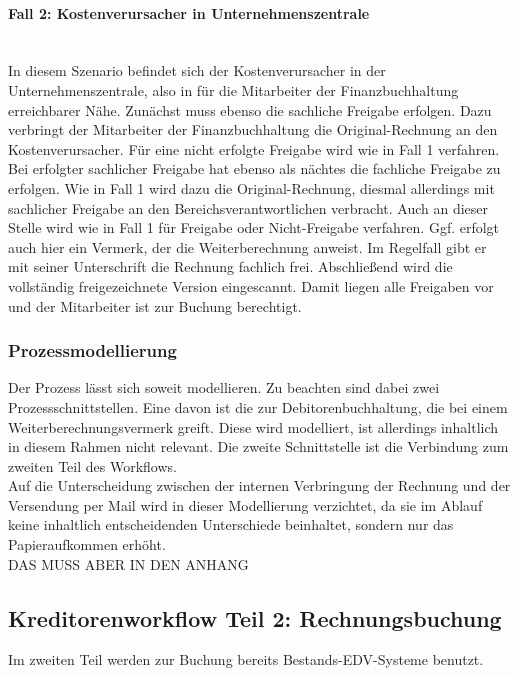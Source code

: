 \paragraph{Fall 2: Kostenverursacher in Unternehmenszentrale}
~\\
In diesem Szenario befindet sich der Kostenverursacher in der Unternehmenszentrale, also in für die Mitarbeiter der Finanzbuchhaltung erreichbarer Nähe.
Zunächst muss ebenso die sachliche Freigabe erfolgen.
Dazu verbringt der Mitarbeiter der Finanzbuchhaltung die Original-Rechnung an den Kostenverursacher.
Für eine nicht erfolgte Freigabe wird wie in Fall 1 verfahren.
Bei erfolgter sachlicher Freigabe hat ebenso als nächtes die fachliche Freigabe zu erfolgen.
Wie in Fall 1 wird dazu die Original-Rechnung, diesmal allerdings mit sachlicher Freigabe an den Bereichsverantwortlichen verbracht.
Auch an dieser Stelle wird wie in Fall 1 für Freigabe oder Nicht-Freigabe verfahren.
Ggf. erfolgt auch hier ein Vermerk, der die Weiterberechnung anweist.
Im Regelfall gibt er mit seiner Unterschrift die Rechnung fachlich frei.
Abschließend wird die vollständig freigezeichnete Version eingescannt.
Damit liegen alle Freigaben vor und der Mitarbeiter ist zur Buchung berechtigt.

\subsubsection{Prozessmodellierung}
Der Prozess lässt sich soweit modellieren. 
Zu beachten sind dabei zwei Prozessschnittstellen. 
Eine davon ist die zur Debitorenbuchhaltung, die bei einem Weiterberechnungsvermerk greift. 
Diese wird modelliert, ist allerdings inhaltlich in diesem Rahmen nicht relevant.
Die zweite Schnittstelle ist die Verbindung zum zweiten Teil des Workflows.\\
Auf die Unterscheidung zwischen der internen Verbringung der Rechnung und der Versendung per Mail wird in dieser Modellierung verzichtet, da sie im Ablauf keine inhaltlich entscheidenden Unterschiede beinhaltet, sondern nur das Papieraufkommen erhöht.
\\
DAS MUSS ABER IN DEN ANHANG


\subsection{Kreditorenworkflow Teil 2: Rechnungsbuchung}
Im zweiten Teil werden zur Buchung bereits Bestands-EDV-Systeme benutzt.
